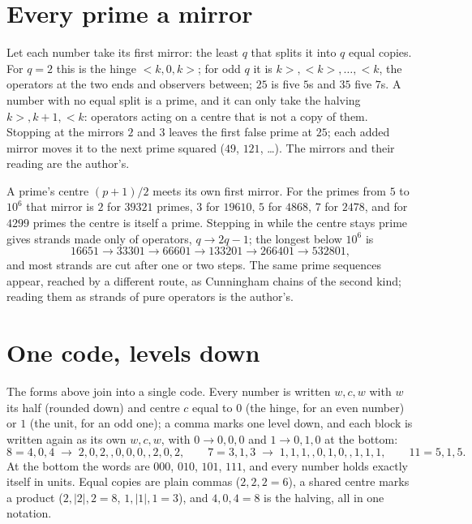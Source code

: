 \documentclass[11pt]{article}
\begin{document}
\section{Every prime a mirror}
Let each number take its first mirror: the least $q$ that splits it into $q$ equal copies. For $q=2$ this is the hinge ${<}k,0,k{>}$; for odd $q$ it is $k{>},{<}k{>},\dots,{<}k$, the operators at the two ends and observers between; $25$ is five $5$s and $35$ five $7$s. A number with no equal split is a prime, and it can only take the halving $k{>},k{+}1,{<}k$: operators acting on a centre that is not a copy of them. Stopping at the mirrors $2$ and $3$ leaves the first false prime at $25$; each added mirror moves it to the next prime squared ($49$, $121$, \dots). The mirrors and their reading are the author's.

A prime's centre $(p+1)/2$ meets its own first mirror. For the primes from $5$ to $10^6$ that mirror is $2$ for $39321$ primes, $3$ for $19610$, $5$ for $4868$, $7$ for $2478$, and for $4299$ primes the centre is itself a prime. Stepping in while the centre stays prime gives strands made only of operators, $q \to 2q-1$; the longest below $10^6$ is
\[ 16651 \to 33301 \to 66601 \to 133201 \to 266401 \to 532801, \]
and most strands are cut after one or two steps. The same prime sequences appear, reached by a different route, as Cunningham chains of the second kind; reading them as strands of pure operators is the author's.

\section{One code, levels down}
The forms above join into a single code. Every number is written $w,c,w$ with $w$ its half (rounded down) and centre $c$ equal to $0$ (the hinge, for an even number) or $1$ (the unit, for an odd one); a comma marks one level down, and each block is written again as its own $w,c,w$, with $0\to0,0,0$ and $1\to0,1,0$ at the bottom:
\[ 8 = 4,0,4 \;\to\; 2,0,2,,0,0,0,,2,0,2,\qquad 7 = 3,1,3 \;\to\; 1,1,1,,0,1,0,,1,1,1,\qquad 11 = 5,1,5. \]
At the bottom the words are $000$, $010$, $101$, $111$, and every number holds exactly itself in units. Equal copies are plain commas ($2,2,2 = 6$), a shared centre marks a product ($2,|2|,2 = 8$, $1,|1|,1 = 3$), and $4,0,4 = 8$ is the halving, all in one notation.
\end{document}
